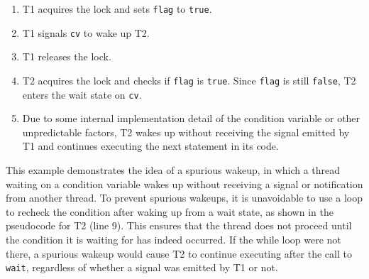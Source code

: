 \begin{enumerate}
      \item T1 acquires the lock and sets \texttt{flag} to \texttt{true}.
      \item T1 signals \texttt{cv} to wake up T2.
      \item T1 releases the lock.
      \item T2 acquires the lock and checks if \texttt{flag} is \texttt{true}.
            Since \texttt{flag} is still \texttt{false},
            T2 enters the wait state on \texttt{cv}.
      \item Due to some internal implementation detail
            of the condition variable or other unpredictable factors,
            T2 wakes up without receiving the signal emitted by T1
            and continues executing the next statement in its code.
\end{enumerate}

This example demonstrates the idea of a spurious wakeup,
in which a thread waiting on a condition variable wakes up
without receiving a signal or notification from another thread.
To prevent spurious wakeups, it is unavoidable to use a loop
to recheck the condition after waking up from a wait state,
as shown in the pseudocode for T2 (line 9).
This ensures that the thread does not proceed
until the condition it is waiting for has indeed occurred.
If the while loop were not there, a spurious wakeup would cause T2 to
continue executing after the call to \texttt{wait},
regardless of whether a signal was emitted by T1 or not.